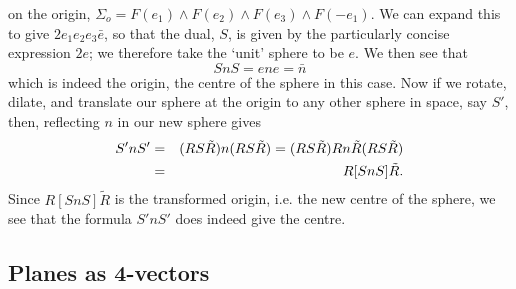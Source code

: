 on the origin, $\Sigma_o = F(e_1)\wedge F(e_2)\wedge
F(e_3)\wedge F(-e_1)$. We can expand this to give
$2e_1e_2e_3\bar{e}$, so that the dual, $S$, is given by
the particularly concise expression $2e$; we therefore
take the `unit' sphere to be $e$. We then see that
%
\begin{equation}
  SnS = ene = \bar{n}
\end{equation}
%
which is indeed the origin, the centre of the
sphere in this case. Now if we rotate, dilate, and
translate our sphere at the origin to any other sphere in
space, say $S'$, then, reflecting $n$ in our new sphere
gives
%
\begin{eqnarray}
  S'nS'&  = &
  (RS\tilde{R})n(RS\tilde{R})=(RS\tilde{R})Rn\tilde{R}(RS\tilde{R})\nonumber
  \\
  & = & R[SnS]\tilde{R}.
\end{eqnarray}
%
Since $R[SnS]\tilde{R}$ is the transformed origin, i.e.
the new centre of the sphere, we see that the formula
$S'nS'$ does indeed give the centre.




\subsection{Planes as 4-vectors}
\label{sec:planes}

